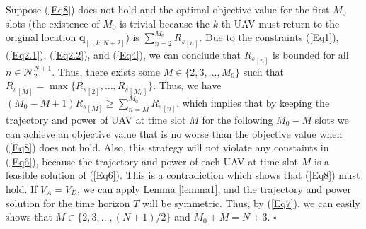 \documentclass[10pt,final,conference]{IEEEtran}
\renewenvironment{proof}{{\noindent\it Proof.}\quad}{\hfill $\square$\par}
\begin{document}
\begin{proof}
	Suppose (\ref{Eq8}) does not hold and the optimal objective value for the first $M_0$ slots (the existence of $M_0$ is trivial because the $k$-th UAV must return to the original location $\boldsymbol{q}_{[:,k,N+2]}$) is $\sum_{n=2}^{M_0} {R_s}_{[n]}$.
	Due to the constraints (\ref{Eq1}), (\ref{Eq2.1}), (\ref{Eq2.2}), and (\ref{Eq4}), we can conclude that ${R_s}_{[n]}$ is bounded for all $n\in\mathcal{N}_2^{N+1}$. Thus, there exists some $M\in\{2,3,\ldots,M_0\}$ such that ${R_s}_{[M]}=\max\{{R_s}_{[2]},\ldots,{R_s}_{[M_0]}\}$. Thus, we have
	$(M_0-M+1){R_s}_{[M]}\geq \sum_{n=M}^{M_0} {R_s}_{[n]}$, 
	which implies that by keeping the trajectory and power of UAV at time slot $M$ for the following $M_0-M$ slots we can achieve an objective value that is no worse than the objective value when (\ref{Eq8}) does not hold. Also, this strategy will not violate any constaints in (\ref{Eq6}), because the trajectory and power of each UAV at time slot $M$ is a feasible solution of (\ref{Eq6}). This is a contradiction which shows that (\ref{Eq8}) must hold.
	If $V_A=V_D$, we can apply Lemma \ref{lemma1}, and the trajectory and power solution for the time horizon $T$ will be symmetric. Thus, by (\ref{Eq7}), we can easily shows that $M\in\{2,3,\ldots,(N+1)/2\}$ and $M_0+M=N+3$.
\end{proof}
\end{document}
